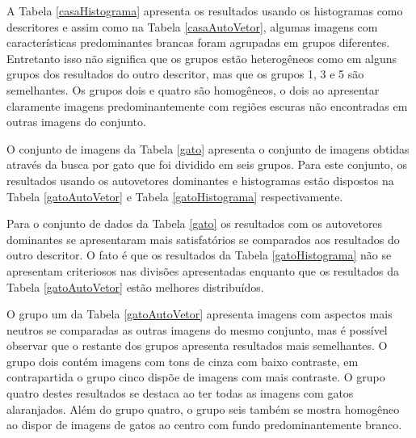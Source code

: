 A Tabela \ref{casaHistograma} apresenta os resultados usando os histogramas como descritores e assim como na Tabela \ref{casaAutoVetor}, algumas imagens com características predominantes brancas foram agrupadas em grupos diferentes. Entretanto isso não significa que os grupos estão heterogêneos como em alguns grupos dos resultados do outro descritor, mas que os grupos 1, 3 e 5 são semelhantes. Os grupos dois e quatro são homogêneos, o dois ao apresentar claramente imagens predominantemente com regiões escuras não encontradas em outras imagens do conjunto.

O conjunto de imagens da Tabela \ref{gato} apresenta o conjunto de imagens obtidas através da busca por gato que foi dividido em seis grupos. Para este conjunto, os resultados usando os autovetores dominantes e histogramas estão dispostos na Tabela \ref{gatoAutoVetor} e Tabela \ref{gatoHistograma} respectivamente.

Para o conjunto de dados da Tabela \ref{gato} os resultados com os autovetores dominantes se apresentaram mais satisfatórios se comparados aos resultados do outro descritor. O fato é que os resultados da Tabela \ref{gatoHistograma} não se apresentam criteriosos nas divisões apresentadas enquanto que os resultados da Tabela \ref{gatoAutoVetor} estão melhores distribuídos. 

O grupo um da Tabela \ref{gatoAutoVetor} apresenta imagens com aspectos mais neutros se comparadas as outras imagens do mesmo conjunto, mas é possível observar que o restante dos grupos apresenta resultados mais semelhantes. O grupo dois contém imagens com tons de cinza com baixo contraste, em contrapartida o grupo cinco dispõe de imagens com mais contraste. O grupo quatro destes resultados se destaca ao ter todas as imagens com gatos alaranjados. Além do grupo quatro, o grupo seis também se mostra homogêneo ao dispor de imagens de gatos ao centro com fundo predominantemente branco.























